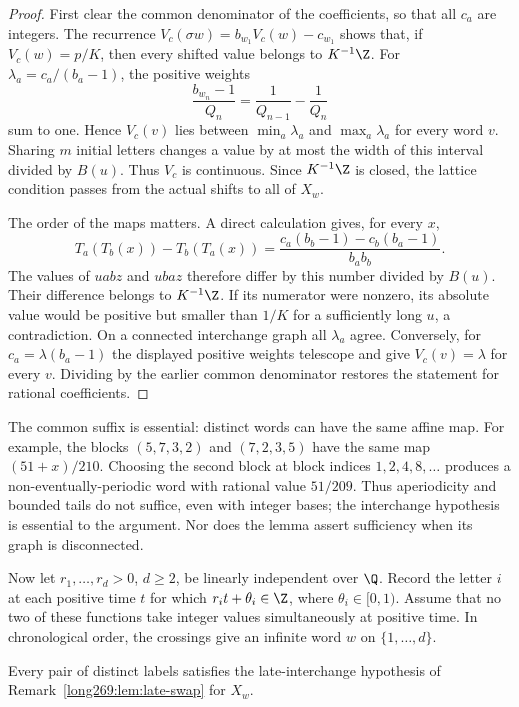 \begin{proof}
First clear the common denominator of the coefficients, so that all $c_a$ are
integers.  The recurrence
$V_c(\sigma w)=b_{w_1}V_c(w)-c_{w_1}$ shows that, if
$V_c(w)=p/K$, then every shifted value belongs to $K^{-1}\Z$.
For $\lambda_a=c_a/(b_a-1)$, the positive weights
\[
 \frac{b_{w_n}-1}{Q_n}=\frac1{Q_{n-1}}-\frac1{Q_n}
\]
sum to one.  Hence $V_c(v)$ lies between $\min_a\lambda_a$ and
$\max_a\lambda_a$ for every word $v$.  Sharing $m$ initial letters
changes a value by at most the width of this interval divided by $B(u)$.
Thus $V_c$ is continuous. Since $K^{-1}\Z$ is closed, the lattice
condition passes from the actual shifts to all of $X_w$.

The order of the maps matters.  A direct calculation gives, for every $x$,
\[
 T_a(T_b(x))-T_b(T_a(x))
  =\frac{c_a(b_b-1)-c_b(b_a-1)}{b_ab_b}.
\]
The values of $uabz$ and $ubaz$ therefore differ by this number divided
by $B(u)$.  Their difference belongs to $K^{-1}\Z$.  If its numerator
were nonzero, its absolute value would be positive but smaller than $1/K$
for a sufficiently long $u$, a contradiction.  On a connected interchange
graph all $\lambda_a$ agree.  Conversely, for
$c_a=\lambda(b_a-1)$ the displayed positive weights telescope and give
$V_c(v)=\lambda$ for every $v$.  Dividing by the earlier common denominator restores the statement for rational coefficients.
\end{proof}

The common suffix is essential: distinct words can have the same affine
map.  For example, the blocks $(5,7,3,2)$ and $(7,2,3,5)$ have the same
map $(51+x)/210$.  Choosing the second block at block indices
$1,2,4,8,\ldots$ produces a non-eventually-periodic word with rational
value $51/209$.  Thus aperiodicity and bounded tails do not suffice, even with integer
bases; the interchange hypothesis is essential to the argument.  Nor does the lemma
assert sufficiency when its graph is disconnected.

Now let $r_1,\ldots,r_d>0$, $d\ge2$, be linearly independent over $\Q$.
Record the letter $i$ at each positive time $t$ for which
$r_it+\theta_i\in\Z$, where $\theta_i\in[0,1)$. Assume that no two of
these functions take integer values simultaneously at positive time.
In chronological order, the crossings give an infinite word $w$ on
$\{1,\ldots,d\}$.

\begin{remark}
\label{long269:lem:clock-swaps}
Every pair of distinct labels satisfies the late-interchange
hypothesis of Remark~\ref{long269:lem:late-swap} for $X_w$.
\end{remark}

